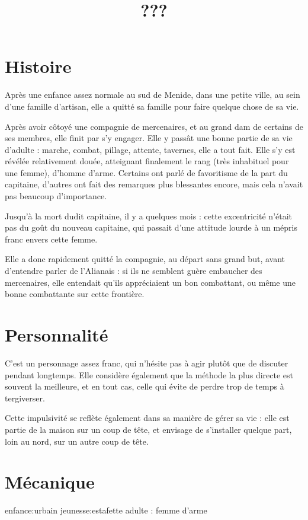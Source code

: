 \documentclass[10pt,a4paper]{article}
\title{???}
\date{}
\begin{document}
\maketitle
\section{Histoire}
Après une enfance assez normale au sud de Menide, dans une petite ville, au sein d'une famille d'artisan, elle a quitté sa famille pour faire quelque chose de sa vie. 

Après avoir côtoyé une compagnie de mercenaires, et au grand dam de certains de ses membres, elle finit par s'y engager. Elle y passât une bonne partie de sa vie d'adulte : marche, combat, pillage, attente, tavernes, elle a tout fait. Elle s'y est révélée relativement douée, atteignant finalement le rang (très inhabituel pour une femme), d'homme d'arme. Certains ont parlé de favoritisme de la part du capitaine, d'autres ont fait des remarques plus blessantes encore, mais cela n'avait pas beaucoup d'importance.

Jusqu'à la mort dudit capitaine, il y a quelques mois : cette excentricité n'était pas du goût du nouveau capitaine, qui passait d'une attitude lourde à un mépris franc envers cette femme.

Elle a donc rapidement quitté la compagnie, au départ sans grand but, avant d'entendre parler de l'Alianais : si ils ne semblent guère embaucher des mercenaires, elle entendait qu'ils appréciaient un bon combattant, ou même une bonne combattante sur cette frontière.
\section{Personnalité}
C'est un personnage assez franc, qui n'hésite pas à agir plutôt que de discuter pendant longtemps. Elle considère également que la méthode la plus directe est souvent la meilleure, et en tout cas, celle qui évite de perdre trop de temps à tergiverser.

Cette impulsivité se reflète également dans sa manière de gérer sa vie : elle est partie de la maison sur un coup de tête, et envisage de s'installer quelque part, loin au nord, sur un autre coup de tête.
\section{Mécanique}
enfance:urbain
jeunesse:estafette
adulte : femme d'arme
\end{document}
